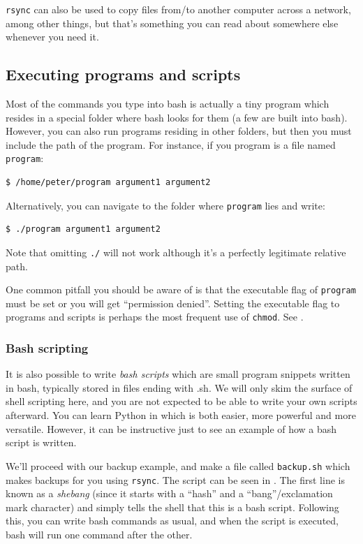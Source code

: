 \verb|rsync| can also be used to copy files from/to another computer across a network, among other things, but that's something you can read about somewhere else whenever you need it.

\subsection{Executing programs and scripts}
Most of the commands you type into bash is actually a tiny program which resides in a special folder where bash looks for them (a few are built into bash). However, you can also run programs residing in other folders, but then you must include the path of the program. For instance, if you program is a file named \verb|program|:

\begin{verbatim}
$ /home/peter/program argument1 argument2
\end{verbatim}
Alternatively, you can navigate to the folder where \verb|program| lies and write:

\begin{verbatim}
$ ./program argument1 argument2
\end{verbatim}
Note that omitting \verb|./| will not work although it's a perfectly legitimate relative path.

One common pitfall you should be aware of is that the executable flag of \verb|program| must be set or you will get ``permission denied''. Setting the executable flag to programs and scripts is perhaps the most frequent use of \verb|chmod|. See .

\subsubsection{Bash scripting}
It is also possible to write \emph{bash scripts} which are small program snippets written in bash, typically stored in files ending with .sh. We will only skim the surface of shell scripting here, and you are not expected to be able to write your own scripts afterward. You can learn Python in  which is both easier, more powerful and more versatile. However, it can be instructive just to see an example of how a bash script is written.

We'll proceed with our backup example, and make a file called \verb|backup.sh| which makes backups for you using \verb|rsync|. The script can be seen in . The first line is known as a \emph{shebang} (since it starts with a ``hash'' and a ``bang''/exclamation mark character) and simply tells the shell that this is a bash script. Following this, you can write bash commands as usual, and when the script is executed, bash will run one command after the other.

